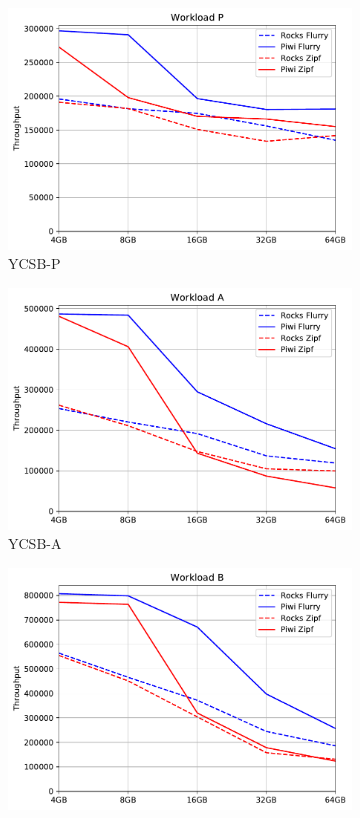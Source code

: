 \begin{figure}[tb]
\centering
\begin{subfigure}{0.3\linewidth}
\includegraphics[width=\textwidth]{figs/Workload_P_line.pdf}
\caption{YCSB-P}
\label{fig:throughput:p}
\end{subfigure}
\hspace{0.2\linewidth}
\begin{subfigure}{0.3\linewidth}
\includegraphics[width=\textwidth]{figs/Workload_A_line.pdf}
\caption{YCSB-A}
\label{fig:throughput:a}
\end{subfigure}
\begin{subfigure}{0.3\linewidth}
\includegraphics[width=\textwidth]{figs/Workload_B_line.pdf}

\end{subfigure}
\end{figure}
